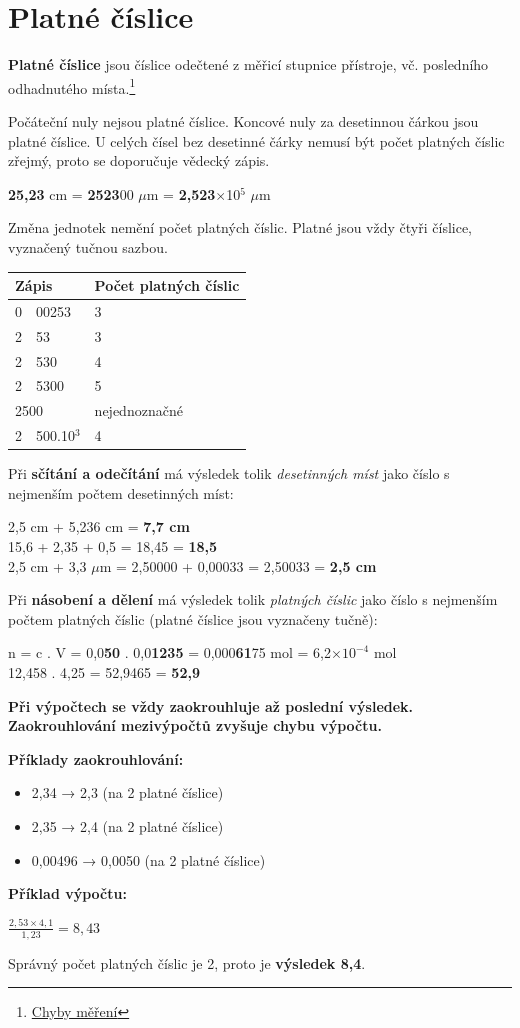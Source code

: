
\section{Platné číslice}

\textbf{Platné číslice} jsou číslice odečtené z měřicí stupnice přístroje, vč. posledního odhadnutého místa.\footnote{\href{https://is.muni.cz/do/sci/UChem/um/laboratorni_technika/pages/uvod.html}{Chyby měření}}

Počáteční nuly nejsou platné číslice. Koncové nuly za desetinnou čárkou jsou platné číslice. U celých čísel bez desetinné čárky nemusí být počet platných číslic zřejmý, proto se doporučuje vědecký zápis.

\textbf{25,23} cm = \textbf{2523}00 $\mu$m = \textbf{2,523}$\times$10$^5$ $\mu$m

Změna jednotek nemění počet platných číslic. Platné jsou vždy čtyři číslice, vyznačený tučnou sazbou.

\begin{tabular}{|r@{,}l|l|}
	\hline
	\multicolumn{2}{|l|}{\textbf{Zápis}} & \textbf{Počet platných číslic} \\\hline
	0 & 00253 & 3 \\\hline
	2 & 53 & 3 \\\hline
	2 & 530 & 4 \\\hline
	2 & 5300 & 5 \\\hline
	\multicolumn{2}{|l|}{2500} & nejednoznačné \\\hline
	2 & 500.10$^3$ & 4 \\\hline
\end{tabular}

Při \textbf{sčítání a odečítání} má výsledek tolik \textit{desetinných míst} jako číslo s nejmenším počtem desetinných míst:

2,5 cm + 5,236 cm = \textbf{7,7 cm}\\
15,6 + 2,35 + 0,5 = 18,45 = \textbf{18,5}\\
2,5 cm + 3,3 $\mu$m = 2,50000 + 0,00033 = 2,50033 = \textbf{2,5 cm}

Při \textbf{násobení a dělení} má výsledek tolik \textit{platných číslic} jako číslo s nejmenším počtem platných číslic (platné číslice jsou vyznačeny tučně):

n = c . V = 0,0\textbf{50} . 0,0\textbf{1235} = 0,000\textbf{61}75 mol = 6,2$\times10^{-4}$ mol\\
12,458 . 4,25 = 52,9465 = \textbf{52,9}

\textbf{Při výpočtech se vždy zaokrouhluje až poslední výsledek. Zaokrouhlování mezivýpočtů zvyšuje chybu výpočtu.}

\textbf{Příklady zaokrouhlování:}
\begin{itemize}
	\item 2,34 → 2,3 (na 2 platné číslice)
	\item 2,35 → 2,4 (na 2 platné číslice)
	\item 0,00496 → 0,0050 (na 2 platné číslice)
\end{itemize}

\textbf{Příklad výpočtu:}

$\frac{2,53 \times 4,1}{1,23} = 8,43$

Správný počet platných číslic je 2, proto je \textbf{výsledek 8,4}.